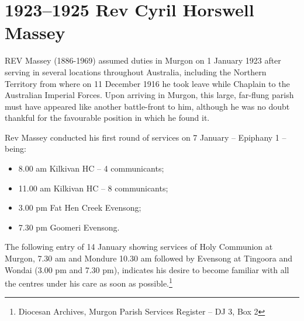 \begin{quote}

\end{quote}



\balance


\printendnotes[custom]
\setcounter{endnote}{0}
\chapter{1923--1925 Rev Cyril Horswell Massey}
\nobalance


\lettrine[lines=3]{R}{EV}
 Massey (1886-1969) assumed duties in Murgon on 1 January 1923 after serving in several locations throughout Australia, including the Northern Territory from where on 11 December 1916 he took leave while Chaplain to the Australian Imperial Forces. Upon arriving in Murgon, this large, far-flung parish must have appeared like another battle-front to him, although he was no doubt thankful for the favourable position in which he found it.

Rev Massey conducted his first round of services on 7 January -- Epiphany 1 -- being:



\begin{itemize}

\item

  8.00 am Kilkivan HC -- 4 communicants;

\item

  11.00 am Kilkivan HC -- 8 communicants;

\item

  3.00 pm Fat Hen Creek Evensong;

\item

  7.30 pm Goomeri Evensong.

\end{itemize}



\smallskip


The following entry of 14 January showing services of Holy Communion at Murgon, 7.30 am and Mondure 10.30 am followed by Evensong at Tingoora and Wondai (3.00 pm and 7.30 pm), indicates his desire to become familiar with all the centres under his care as soon as possible.\footnote{Diocesan Archives, Murgon Parish Services Register -- DJ 3, Box 2}


